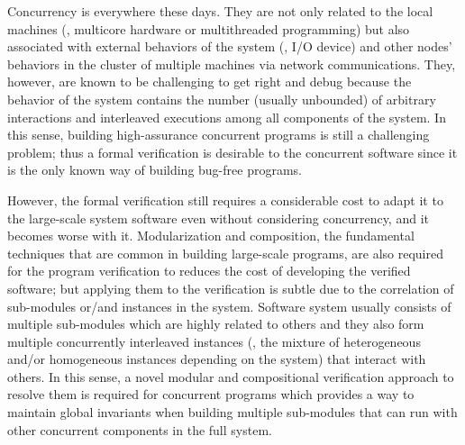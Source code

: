 Concurrency is everywhere these days. 
They are not only related to the local machines (\ie, multicore hardware or multithreaded programming)
but also associated with external behaviors of the system (\ie, I/O device) and other nodes' behaviors in the cluster of multiple machines via network communications.
They, however, are known to be challenging to get right and debug because the behavior of the system contains the number (usually unbounded) of arbitrary interactions and interleaved executions among all components of the system. 
In this sense, building high-assurance concurrent programs is still a challenging problem;
thus a formal verification is desirable to the concurrent software since
 it is the only known way of building bug-free programs.

However, the formal verification still requires a considerable cost to adapt it to the large-scale system software even without considering concurrency, and it becomes worse with it. 
Modularization and composition, the fundamental techniques that are common in building large-scale programs,
are also required for the program verification to reduces the cost of developing the verified software;
but applying them to the verification is subtle due to the correlation 
of sub-modules or/and instances in the system.
Software system usually consists of multiple sub-modules which are highly related to others
and they also form multiple concurrently interleaved instances (\ie, the mixture of heterogeneous and/or homogeneous instances depending on the system)
that interact with others.
In this sense, a novel modular and compositional verification approach to resolve them is required for concurrent programs
which provides a way to maintain global invariants when building multiple sub-modules that can run with 
other concurrent components in the full system.

